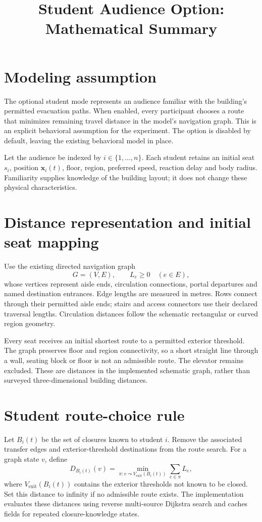 \documentclass[11pt]{article}
\title{Student Audience Option: Mathematical Summary}
\author{}
\date{}
\begin{document}
\maketitle

\section{Modeling assumption}
The optional student mode represents an audience familiar with the building's
permitted evacuation paths. When enabled, every participant chooses a route
that minimizes remaining travel distance in the model's navigation graph.
This is an explicit behavioral assumption for the experiment. The option is
disabled by default, leaving the existing behavioral model in place.

Let the audience be indexed by $i\in\{1,\ldots,n\}$. Each student retains an
initial seat $s_i$, position $\mathbf x_i(t)$, floor, region, preferred speed,
reaction delay and body radius. Familiarity supplies knowledge of the building
layout; it does not change these physical characteristics.

\section{Distance representation and initial seat mapping}
Use the existing directed navigation graph
\[
 G=(V,E),\qquad L_e\geq0\quad(e\in E),
\]
whose vertices represent aisle ends, circulation connections, portal departures
and named destination entrances. Edge lengths are measured in metres.
Rows connect through their permitted aisle ends; stairs and access connectors
use their declared traversal lengths. Circulation distances follow the
schematic rectangular or curved region geometry.

Every seat receives an initial shortest route to a permitted exterior
threshold. The graph preserves floor and region connectivity, so a short
straight line through a wall, seating block or floor is not an admissible
route. The elevator remains excluded. These are distances in the implemented
schematic graph, rather than surveyed three-dimensional building distances.

\section{Student route-choice rule}
Let $B_i(t)$ be the set of closures known to student $i$. Remove the associated
transfer edges and exterior-threshold destinations from the route search.
For a graph state $v$, define
\[
 D_{B_i(t)}(v)=
 \min_{\pi:v\leadsto V_{\mathrm{exit}}(B_i(t))}
                         \sum_{e\in\pi}L_e,
\]
where $V_{\mathrm{exit}}(B_i(t))$ contains the exterior thresholds not known
to be closed. Set this distance to infinity if no admissible route exists.
The implementation evaluates these distances using reverse multi-source
Dijkstra search and caches fields for repeated closure-knowledge states.
\end{document}
